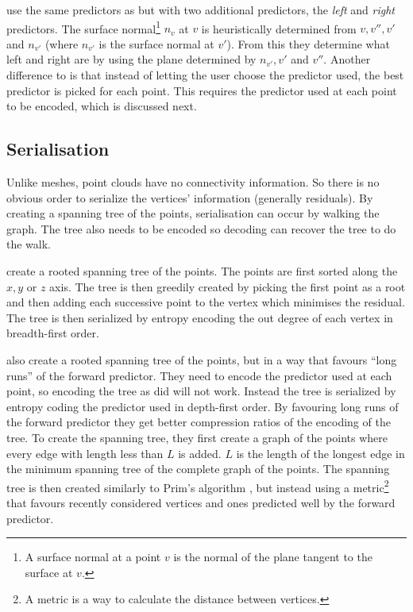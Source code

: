 \documentclass[a4paper]{report}
\begin{document}
\citep{merrycomp} use the same predictors as \citep{gumholdcomp} but with two
additional predictors, the \emph{left} and \emph{right} predictors. The
surface normal\footnote{A surface normal at a point $v$ is the normal of the
  plane tangent to the surface at $v$.} $n_v$ at $v$ is heuristically
determined from $v, v'', v'$ and $n_{v'}$ (where $n_{v'}$ is the surface
normal at $v'$). From this they determine what left and right are by using the
plane determined by $n_{v'}, v'$ and $v''$. Another difference to
\citep{gumholdcomp} is that instead of letting the user choose the
predictor used, the best predictor is picked for each point. This requires the
predictor used at each point to be encoded, which is discussed next.


\subsection{Serialisation}
\label{sec:serialisation}

Unlike meshes, point clouds have no connectivity information. So there is no
obvious order to serialize the vertices' information (generally residuals). By
creating a spanning tree of the points, serialisation can occur by walking the
graph. The tree also needs to be encoded so decoding can recover the tree to
do the walk.

\citep{gumholdcomp} create a rooted spanning tree of the points. The points
are first sorted along the $x, y$ or $z$ axis. The tree is then greedily
created by picking the first point as a root and then adding each successive
point to the vertex which minimises the residual. The tree is then serialized
by entropy encoding the out degree of each vertex in breadth-first order.

\citep{merrycomp} also create a rooted spanning tree of the points, but in a
way that favours ``long runs'' of the forward predictor. They need to encode
the predictor used at each point, so encoding the tree as \citep{gumholdcomp}
did will not work. Instead the tree is serialized by entropy coding the
predictor used in depth-first order. By favouring long runs of the forward
predictor they get better compression ratios of the encoding of the tree. To
create the spanning tree, they first create a graph of the points where every
edge with length less than $L$ is added. $L$ is the length of the longest edge
in the minimum spanning tree of the complete graph of the points. The spanning
tree is then created similarly to Prim's algorithm \citep[p.\ 457]{sedgewick},
but instead using a metric\footnote{A metric is a way to calculate the
  distance between vertices.} that favours recently considered vertices and
ones predicted well by the forward predictor.
\end{document}
